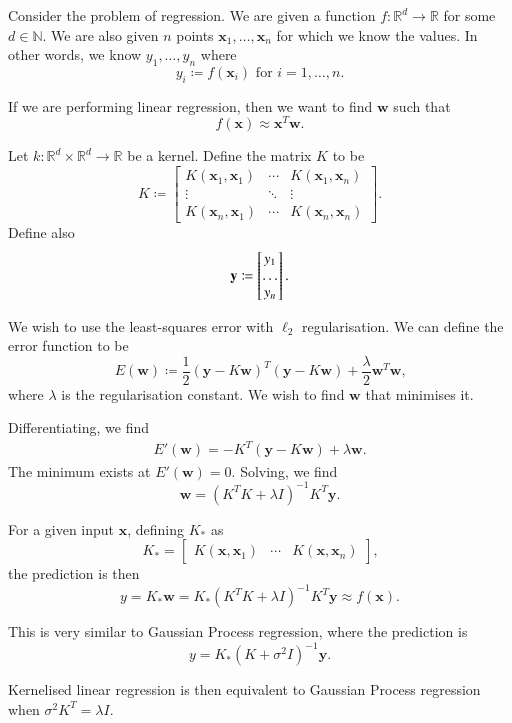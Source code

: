\documentclass[11pt, oneside]{article}
\newcommand{\bw}{\mathbf{w}}
\newcommand{\bx}{\mathbf{x}}
\newcommand{\by}{\mathbf{y}}
\newcommand{\bbN}{\mathbb{N}}
\newcommand{\bbR}{\mathbb{R}}
\begin{document}
Consider the problem of regression. We are given a function $f : \bbR^d \to \bbR$ for some $d \in \bbN$. We are also given $n$ points $\bx_1, \dots, \bx_n$ for which we know the values. In other words, we know $y_1, \dots, y_n$ where \[
    y_i \coloneqq f(\bx_i)\text{ for }i = 1, \dots, n\text{.}
\]

If we are performing linear regression, then we want to find $\bw$ such that \[
    f(\bx) \approx \bx^T\bw \text{.}
\]

Let $k : \bbR^d \times \bbR^d \to \bbR$ be a kernel. Define the matrix $K$ to be \[
    K \coloneqq \begin{bmatrix}
        K(\bx_1, \bx_1) & \cdots & K(\bx_1, \bx_n) \\
        \vdots & \ddots & \vdots \\
        K(\bx_n, \bx_1) & \cdots & K(\bx_n, \bx_n)
    \end{bmatrix} \text{.}
\] Define also\[
    \by \coloneqq \begin{bmatrix}
        y_1 \\
        \dots \\
        y_n
    \end{bmatrix} \text.
\]

We wish to use the least-squares error with $\ell_2$ regularisation. We can define the error function to be \[
    E(\bw) \coloneqq \frac12 \left(\by - K \bw\right)^T\left(\by - K \bw\right) + \frac\lambda2 \bw^T\bw \text{,}
\] where $\lambda$ is the regularisation constant. We wish to find $\bw$ that minimises it.

Differentiating, we find\begin{align*}
    E'(\bw) = -K^T(\by - K\bw) + \lambda\bw\text{.}
\end{align*} The minimum exists at $E'(\bw) = 0$. Solving, we find \[
    \bw = \left(K^TK + \lambda I\right)^{-1}K^T\by\text{.}
\]

For a given input $\bx$, defining $K_*$ as \[
    K_* = \begin{bmatrix}
        K(\bx, \bx_1) &
        \cdots &
        K(\bx, \bx_n)
    \end{bmatrix} \text{,}
\]the prediction  is then \[
    y = K_*\bw = K_* \left(K^TK + \lambda I\right)^{-1}K^T\by \approx f(\bx) \text{.}
\]

This is very similar to Gaussian Process regression, where the prediction is \[
    y = K_*\left(K + \sigma^2 I\right)^{-1}\by \text{.}
\]

Kernelised linear regression is then equivalent to Gaussian Process regression when $\sigma^2 K^T = \lambda I$.
\end{document}
